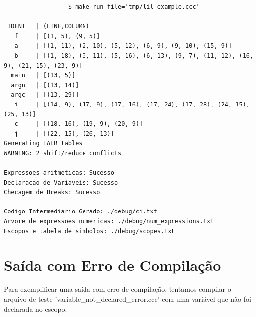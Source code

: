 \documentclass[
	12pt,				%
	openright,			%
	twoside,			%
	a4paper,			%
	english,			%
	french,				%
	spanish,			%
	brazil				%
	]{abntex2}
\begin{document}
\begin{lstlisting}
                  $ make run file='tmp/lil_example.ccc'

 IDENT   | (LINE,COLUMN)                                                                                       
   f     | [(1, 5), (9, 5)]                                                                                    
   a     | [(1, 11), (2, 10), (5, 12), (6, 9), (9, 10), (15, 9)]                                               
   b     | [(1, 18), (3, 11), (5, 16), (6, 13), (9, 7), (11, 12), (16, 9), (21, 15), (23, 9)]                  
  main   | [(13, 5)]                                                                                           
  argn   | [(13, 14)]                                                                                          
  argc   | [(13, 29)]                                                                                          
   i     | [(14, 9), (17, 9), (17, 16), (17, 24), (17, 28), (24, 15), (25, 13)]                                
   c     | [(18, 16), (19, 9), (20, 9)]                                                                        
   j     | [(22, 15), (26, 13)]                                                                                
Generating LALR tables
WARNING: 2 shift/reduce conflicts

Expressoes aritmeticas: Sucesso
Declaracao de Variaveis: Sucesso
Checagem de Breaks: Sucesso

Codigo Intermediario Gerado: ./debug/ci.txt
Arvore de expressoes numericas: ./debug/num_expressions.txt
Escopos e tabela de simbolos: ./debug/scopes.txt
\end{lstlisting}

\section{Saída com Erro de Compilação}
Para exemplificar uma saída com erro de compilação, tentamos compilar o arquivo de teste
'variable\_not\_declared\_error.ccc' com uma variável que não foi declarada no escopo.
\end{document}
